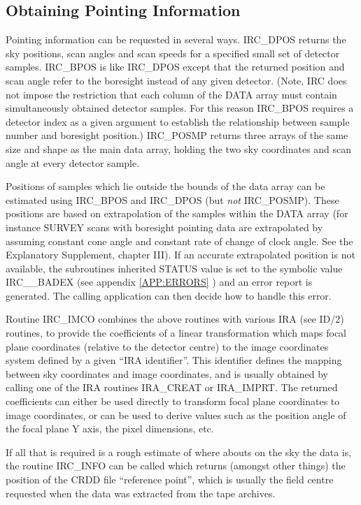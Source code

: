 \subsection {Obtaining Pointing Information}
Pointing information can be requested in several ways. IRC\_DPOS returns the sky
positions, scan angles and scan speeds for a specified small set of detector
samples. IRC\_BPOS is like IRC\_DPOS except that the returned position and scan
angle refer to the boresight instead of any given detector. (Note, IRC does not
impose the restriction that each column of the DATA array must contain
simultaneously obtained detector samples. For this reason IRC\_BPOS requires a
detector index as a given argument to establish the relationship between sample
number and boresight position.) IRC\_POSMP returns three arrays of the same size
and shape as the main data array, holding the two sky coordinates and scan
angle at every detector sample.

Positions of samples which lie outside the bounds of the data array can be
estimated using IRC\_BPOS and IRC\_DPOS (but {\em not} IRC\_POSMP). These
positions are based on extrapolation of the samples within the DATA array (for
instance SURVEY scans with boresight pointing data are extrapolated by assuming
constant cone angle and constant rate of change of clock angle. See the
Explanatory Supplement, chapter III). If an accurate extrapolated position is
not available, the subroutines inherited STATUS value is set to the symbolic
value IRC\_\_BADEX (see appendix \ref {APP:ERRORS} ) and an error report is
generated. The calling application can then decide how to handle this error.

Routine IRC\_IMCO combines the above routines with various IRA (see ID/2)
routines, to provide the coefficients of a linear transformation which maps
focal plane coordinates (relative to the detector centre) to the image
coordinates system defined by a given ``IRA identifier''. This identifier
defines the mapping between sky coordinates and image coordinates, and is
usually obtained by calling one of the IRA routines IRA\_CREAT or IRA\_IMPRT.
The returned coefficients can either be used directly to transform focal plane
coordinates to image coordinates, or can be used to derive values such as the
position angle of the focal plane Y axis, the pixel dimensions, etc.

If all that is required is a rough estimate of where abouts on the sky the data
is, the routine IRC\_INFO can be called which returns (amongst other things) the
position of the CRDD file ``reference point'', which is usually the
field centre requested when the data was extracted from the tape archives.

